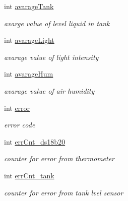 \begin{DoxyCompactItemize}
\mbox{\label{_arduino_8ino_af5e0ea6db57c01a90d06aa2e41644457}} 
int \hyperlink{_arduino_8ino_af5e0ea6db57c01a90d06aa2e41644457}{avarage\+Tank}
\begin{DoxyCompactList}\small\item\em avarge value of level liquid in tank \end{DoxyCompactList}\item 
\mbox{\label{_arduino_8ino_a308d3494d1a6c60ad321fe2681dd84eb}} 
int \hyperlink{_arduino_8ino_a308d3494d1a6c60ad321fe2681dd84eb}{avarage\+Light}
\begin{DoxyCompactList}\small\item\em avarage value of light intensity \end{DoxyCompactList}\item 
\mbox{\label{_arduino_8ino_a5f7ab85b02c44f467b415757d40c513a}} 
int \hyperlink{_arduino_8ino_a5f7ab85b02c44f467b415757d40c513a}{avarage\+Hum}
\begin{DoxyCompactList}\small\item\em avarage value of air humidity \end{DoxyCompactList}\item 
\mbox{\label{_arduino_8ino_a11614f44ef4d939bdd984953346a7572}} 
int \hyperlink{_arduino_8ino_a11614f44ef4d939bdd984953346a7572}{error}
\begin{DoxyCompactList}\small\item\em error code \end{DoxyCompactList}\item 
\mbox{\label{_arduino_8ino_a4bba68f0c545695ccbee78cbc3178c52}} 
int \hyperlink{_arduino_8ino_a4bba68f0c545695ccbee78cbc3178c52}{err\+Cnt\+\_\+ds18b20}
\begin{DoxyCompactList}\small\item\em counter for error from thermometer \end{DoxyCompactList}\item 
\mbox{\label{_arduino_8ino_a762324a017b4ef844d8ef04f1c2ff667}} 
int \hyperlink{_arduino_8ino_a762324a017b4ef844d8ef04f1c2ff667}{err\+Cnt\+\_\+tank}
\begin{DoxyCompactList}\small\item\em counter for error from tank lvel sensor \end{DoxyCompactList}\item 

\end{DoxyCompactItemize}
